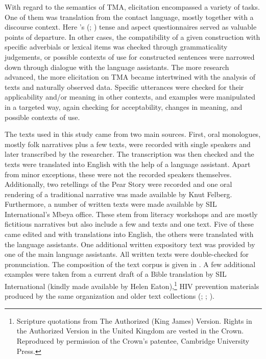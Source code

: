 With regard to the semantics of TMA, elicitation encompassed a variety of tasks. One of them was translation from the contact language, mostly together with a discourse context. Here \citeauthor{DahlOe1985}'s (\citeyear{DahlOe1985}; \citeyear{DahlOe2000a}) tense and aspect questionnaires served as valuable points of departure. In other cases, the compatibility of a given construction with specific adverbials or lexical items was checked through grammaticality judgements, or possible contexts of use for constructed sentences were narrowed down through dialogue with the language assistants. The more research advanced, the more elicitation on TMA became intertwined with the analysis of texts and naturally observed data. Specific utterances were checked for their applicability and/or meaning in other contexts, and examples were manipulated in a targeted way, again checking for acceptability, changes in meaning, and possible contexts of use.

The texts used in this study came from two main sources. First, oral monologues, mostly folk narratives plus a few  texts, were recorded with single speakers and later transcribed by the researcher. The transcription was then checked and the texts were translated into English with the help of a language assistant. Apart from minor exceptions, these were not the recorded speakers themselves. Additionally, two retellings of the Pear Story \citep{ChafeW1980} were recorded and one oral rendering of a traditional narrative was made available by Knut Felberg.
Furthermore, a number of written texts were made available by SIL International's Mbeya office. These stem from literacy workshops and are mostly fictitious narratives but also include a few  and  texts and one  text. Five of these came edited and with translations into English, the others were translated with the language assistants. One additional written expository text was provided by one of the main language assistants. All written texts were double-checked for pronunciation. The composition of the text corpus is given in . A few additional examples were taken from a current draft of a Bible translation by SIL International (kindly made available by Helen Eaton),\footnote{Scripture quotations from The Authorized (King James) Version. Rights in the Authorized Version in the United Kingdom are vested in the Crown. Reproduced by permission of the Crown’s patentee, Cambridge University Press.} HIV prevention materials produced by the same organization and older text collections (\citealt{BergerP1933}; \citealt{BusseJ1942}; \citeyear{BusseJ1949}).


